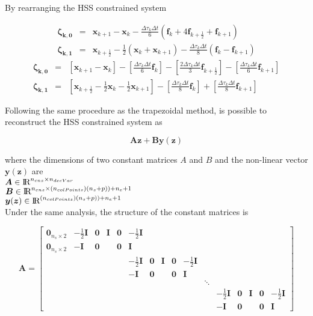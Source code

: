 \documentclass[12pt]{article}
\newcommand{\real}{\mbox{\rm I$\!$R}}
\begin{document}
\noindent By rearranging the HSS constrained system

\begin{eqnarray}
    \bm{\zeta_{k,0}} &=&\bm{x}_{k+1}-\bm{x}_{k}- \frac{\Delta\tau_k \Delta t}{6}(\bm{f}_{k}+4\bm{f}_{k+\frac{1}{2}}+\bm{f}_{k+1}) \nonumber\\
    \bm{\zeta_{k,1}} &=&\bm{x}_{k+\frac{1}{2}}-\frac{1}{2}(\bm{x}_{k}+\bm{x}_{k+1})- \frac{\Delta\tau_k \Delta t}{8}(\bm{f}_{k}-\bm{f}_{k+1}) \nonumber
\end{eqnarray}
\begin{eqnarray}
    \bm{\zeta_{k,0}} &=&[\bm{x}_{k+1}-\bm{x}_{k}]- [\frac{\Delta\tau_k \Delta t}{6}\bm{f}_{k}] -[\frac{2\Delta\tau_k \Delta t}{3}\bm{f}_{k+\frac{1}{2}}]-[\frac{\Delta\tau_k \Delta t}{6}\bm{f}_{k+1}]\\
    \bm{\zeta_{k,1}} &=&[\bm{x}_{k+\frac{1}{2}}-\frac{1}{2}\bm{x}_{k}-\frac{1}{2}\bm{x}_{k+1}]- [\frac{\Delta\tau_k \Delta t}{8}\bm{f}_{k}]+[\frac{\Delta\tau_k \Delta t}{8}\bm{f}_{k+1}]
\end{eqnarray}

\noindent Following the same procedure as the trapezoidal method, is possible to reconstruct the HSS constrained system as

\begin{equation}
    \bm{A}\bm{z} + \bm{B}\bm{\bm{y}(\bm{z})}
\end{equation}

\noindent where the dimensions of two constant matrices $A$ and $B$ and the non-linear vector $\bm{y}(\bm{z})$ are \\
$\bm{A} \in \real^{n_{cns} \times n_{decVar}}$ \\
$\bm{B} \in \real^{n_{cns} \times (n_{colPoints})(n_s + p))+n_e+1}$ \\
$\bm{y}(\bm{z}) \in \real^{(n_{colPoints})(n_s + p))+n_e+1}$\\   

\noindent Under the same analysis, the structure of the constant matrices is

\begin{equation}
    \bm{A}= \begin{bmatrix}
 \bm{0}_{n_s \times 2}& -\frac{1}{2}\bm{I} & \bm{0} & \bm{I} & \bm{0} & -\frac{1}{2}\bm{I} &  &  &  &  &  &  &  &  &  & \\ 
 \bm{0}_{n_s \times 2}& -\bm{I} & \bm{0} &  & \bm{0} & \bm{I} &  &  &  &  &  &  &  &  &  & \\ 
 &  &  &  &  & -\frac{1}{2}\bm{I} & \bm{0} & \bm{I}& \bm{0} & -\frac{1}{2}\bm{I} &  &  &  &  &  & \\ 
 &  &  &  &  & -\bm{I} & \bm{0} &  & \bm{0} & \bm{I} &  &  &  &  &  & \\ 
 &  &  &  &  &  &  &  &  &  & \ddots &  &  &  &  & \\ 
 &  &  &  &  &  &  &  &  &  &  & -\frac{1}{2}\bm{I} & \bm{0} & \bm{I} & \bm{0} & -\frac{1}{2}\bm{I} \\ 
 &  &  &  &  &  &  &  &  &  &  & -\bm{I} & \bm{0} &  & \bm{0} & \bm{I} 
\end{bmatrix} \nonumber
\end{equation}
\end{document}
